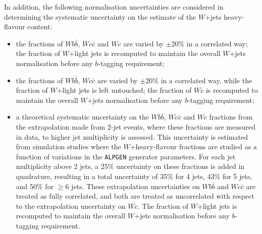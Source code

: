 
In addition, the following normalisation uncertainties are considered in
determining the systematic uncertainty on the estimate of the $W$+jets
heavy-flavour content:
\begin{itemize}
\item the fractions of $Wb\bar{b}$, $Wc\bar{c}$ and $Wc$ are varied by $\pm 20\%$ 
in a correlated way; the fraction of $W$+light jets is recomputed to
maintain the overall  $W$+jets normalisation before any $b$-tagging requirement;
\item  the fractions of $Wb\bar{b}$, $Wc\bar{c}$ are varied by $\pm 20\%$ 
in a correlated way, while the fraction of $W$+light jets is left untouched; the
fraction of $Wc$ is recomputed to maintain the overall  $W$+jets normalisation before any $b$-tagging requirement;
\item a theoretical systematic uncertainty on the $Wb\bar{b}$, $Wc\bar{c}$  and $Wc$ fractions
from the extrapolation made from 2-jet events, where these fractions are measured in data, 
to higher jet multiplicity is assessed. This uncertainty is estimated from simulation studies where
the $W$+heavy-flavour fractions are studied as a function of variations in the \texttt{ALPGEN} generator parameters.
For each jet multiplicity above 2 jets, a 25\% uncertainty
on these fractions is added in quadrature, resulting in a total uncertainty of 35\% for 4 jets, 43\% for 5 jets,
and 50\% for $\geq 6$ jets. 
These extrapolation uncertainties on $Wb\bar{b}$ and $Wc\bar{c}$ are
treated as fully correlated, and both are treated as uncorrelated with respect to
the extrapolation uncertainty on $Wc$.
The fraction of $W$+light jets is recomputed to
maintain the overall  $W$+jets normalisation  before any $b$-tagging requirement.
\end{itemize}
